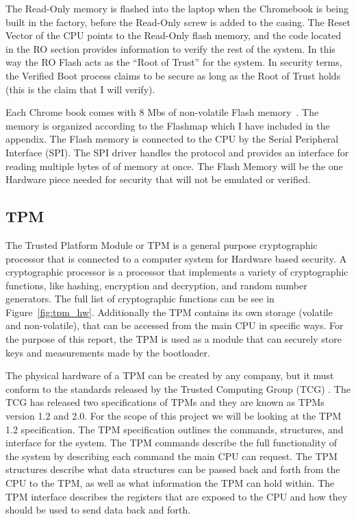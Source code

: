 \documentclass[../report.tex]{subfiles}
\begin{document}
The Read-Only memory is flashed into the laptop when the Chromebook is being built in the factory, before the Read-Only screw is added to the casing. 
The Reset Vector of the CPU points to the Read-Only flash memory, and the code located in the RO section provides information to verify the rest of the system.
In this way the RO Flash acts as the ``Root of Trust'' for the system.
In security terms, the Verified Boot process claims to be secure as long as the
Root of Trust holds (this is the claim that I will verify).

Each Chrome book comes with 8 Mbs of non-volatile Flash memory~\cite{fw-summit}.
The memory is organized according to the Flashmap which I have included in the appendix.
The Flash memory is connected to the CPU by the Serial Peripheral Interface (SPI).
The SPI driver handles the protocol and provides an interface for reading multiple bytes of of memory at once.
The Flash Memory will be the one Hardware piece needed for security that will not be emulated or verified.

\subsection{TPM}\label{sec:TPM}

The Trusted Platform Module or TPM is a general purpose cryptographic processor that is connected to a computer system for Hardware based security\cite{TPM}.
A cryptographic processor is a processor that implements a variety of
cryptographic functions, like hashing, encryption and decryption, and random
number generators. The full list of cryptographic functions can be see in
Figure~\ref{fig:tpm_hw}.
Additionally the TPM contains its own storage (volatile and non-volatile), that can be accessed from the main CPU in specific ways.
For the purpose of this report, the TPM is used as a module that can securely store keys and measurements made by the bootloader.

The physical hardware of a TPM can be created by any company, but it must conform to the standards released by the Trusted Computing Group (TCG) \cite{TCG}.
The TCG has released two specifications of TPMs and they are known as TPMs version 1.2 and 2.0.
For the scope of this project we will be looking at the TPM 1.2 specification.
The TPM specification outlines the commands, structures, and interface for the system.
The TPM commands describe the full functionality of the system by describing each command the main CPU can request.
The TPM structures describe what data structures can be passed back and forth from the CPU to the TPM, as well as what information the TPM can hold within.
The TPM interface describes the registers that are exposed to the CPU and how they should be used to send data back and forth.
\end{document}
